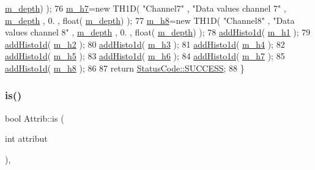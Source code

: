 \begin{DoxyCode}
      \hyperlink{classStorageFifo_a4312878a2a96e6a306be9e5fd99064d5}{m\_depth}) );
76   \hyperlink{classStorageFifo_a01784ff4138a1b32eb517931b5866cc6}{m\_h7}=\textcolor{keyword}{new} TH1D( \textcolor{stringliteral}{"Channel7"} , \textcolor{stringliteral}{"Data values channel 7"} , \hyperlink{classStorageFifo_a4312878a2a96e6a306be9e5fd99064d5}{m\_depth} , 0. , \textcolor{keywordtype}{float}(
      \hyperlink{classStorageFifo_a4312878a2a96e6a306be9e5fd99064d5}{m\_depth}) );
77   \hyperlink{classStorageFifo_aeef4b7183e14d05bab673d948d85b84c}{m\_h8}=\textcolor{keyword}{new} TH1D( \textcolor{stringliteral}{"Channel8"} , \textcolor{stringliteral}{"Data values channel 8"} , \hyperlink{classStorageFifo_a4312878a2a96e6a306be9e5fd99064d5}{m\_depth} , 0. , \textcolor{keywordtype}{float}(
      \hyperlink{classStorageFifo_a4312878a2a96e6a306be9e5fd99064d5}{m\_depth}) );
78   \hyperlink{classProcessus_ad46e0d4dfdfdcbce001ee6be1746dfa4}{addHisto1d}( \hyperlink{classStorageFifo_abe762844e442bc8188643b18b276d801}{m\_h1} );
79   \hyperlink{classProcessus_ad46e0d4dfdfdcbce001ee6be1746dfa4}{addHisto1d}( \hyperlink{classStorageFifo_a3caf6211541aaa4be8e60c03d79bf253}{m\_h2} );
80   \hyperlink{classProcessus_ad46e0d4dfdfdcbce001ee6be1746dfa4}{addHisto1d}( \hyperlink{classStorageFifo_a7e6b54c96a9b53a9917f7f21bda12b2e}{m\_h3} );
81   \hyperlink{classProcessus_ad46e0d4dfdfdcbce001ee6be1746dfa4}{addHisto1d}( \hyperlink{classStorageFifo_ad026ffc1c7590bb3563538490be9aa00}{m\_h4} );
82   \hyperlink{classProcessus_ad46e0d4dfdfdcbce001ee6be1746dfa4}{addHisto1d}( \hyperlink{classStorageFifo_ae9133c5421f9fa166b837933706d2a59}{m\_h5} );
83   \hyperlink{classProcessus_ad46e0d4dfdfdcbce001ee6be1746dfa4}{addHisto1d}( \hyperlink{classStorageFifo_a39ca376b2a74643c54e4df2dfabf0906}{m\_h6} );
84   \hyperlink{classProcessus_ad46e0d4dfdfdcbce001ee6be1746dfa4}{addHisto1d}( \hyperlink{classStorageFifo_a01784ff4138a1b32eb517931b5866cc6}{m\_h7} );
85   \hyperlink{classProcessus_ad46e0d4dfdfdcbce001ee6be1746dfa4}{addHisto1d}( \hyperlink{classStorageFifo_aeef4b7183e14d05bab673d948d85b84c}{m\_h8} );
86 
87   \textcolor{keywordflow}{return} \hyperlink{classStatusCode_a6f565cbeadc76d14c72f047e5e85eb4badd0da38d3ba0d922efd1f4619bc37ad8}{StatusCode::SUCCESS};
88 \}
\end{DoxyCode}
\mbox{\label{classAttrib_a704f26af560909ad22065083bb7d4c34}} 
\subsubsection{\texorpdfstring{is()}{is()}}
{\footnotesize\ttfamily bool Attrib\+::is (\begin{DoxyParamCaption}\item[{int}]{attribut }\end{DoxyParamCaption})\hspace{0.3cm}{\ttfamily [inline]}, {\ttfamily [inherited]}}

